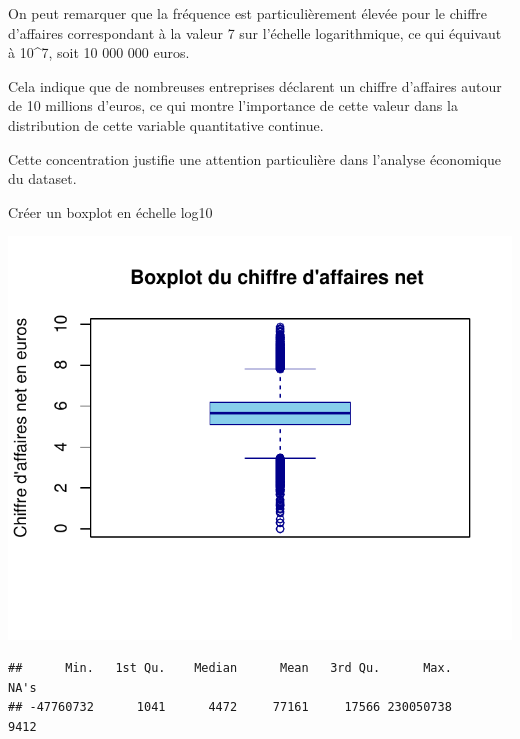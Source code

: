 \documentclass[mstat,12pt]{unswthesis}
\begin{document}
\medskip

On peut remarquer que la fréquence est particulièrement élevée pour le
chiffre d'affaires correspondant à la valeur 7 sur l'échelle
logarithmique, ce qui équivaut à 10\^{}7, soit 10 000 000 euros.

\medskip

Cela indique que de nombreuses entreprises déclarent un chiffre
d'affaires autour de 10 millions d'euros, ce qui montre l'importance de
cette valeur dans la distribution de cette variable quantitative
continue.

\medskip

Cette concentration justifie une attention particulière dans l'analyse
économique du dataset.

\medskip

Créer un boxplot en échelle log10

\medskip

\includegraphics{scdon2-UPV-report-template_sansPython_files/figure-latex/unnamed-chunk-29-1.pdf}

\medskip

\begin{verbatim}
##      Min.   1st Qu.    Median      Mean   3rd Qu.      Max.      NA's 
## -47760732      1041      4472     77161     17566 230050738      9412
\end{verbatim}
\end{document}
